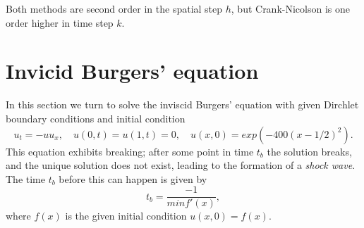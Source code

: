 Both methods are second order in the spatial step $h$, 
but Crank-Nicolson is one order higher in time step $k$. 

\begin{figure}[ht]
    \centering
    
    \label{fig:2a-convergence}
\end{figure}

\begin{figure}[ht]
    \centering
    
    \label{fig:2b-convergence}
\end{figure}


%
%    

\section{Invicid Burgers' equation}

In this section we turn to solve the inviscid Burgers' equation with given Dirchlet boundary conditions and initial condition
\begin{equation}
    u_t = -uu_x, \quad u(0, t) = u(1, t) = 0, \quad u(x, 0) = exp(-400(x-1/2)^2).
    \label{eq:burger}
\end{equation}
This equation exhibits breaking; 
after some point in time $t_b$ the solution breaks, 
and the unique solution does not exist, 
leading to the formation of a \textit{shock wave}.\cite{burgers} 
The time $t_b$ before this can happen is given by
\begin{equation}
    t_b = \frac{-1}{min f'(x)}, 
    \label{eq:t_break}
\end{equation}
where $f(x)$ is the given initial condition $u(x, 0) = f(x)$.\cite{burgers} 

